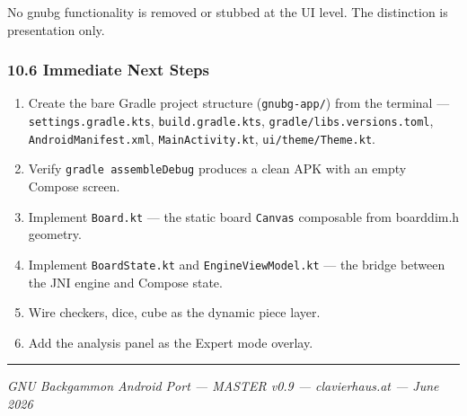 \documentclass[11pt,a4paper]{article}
\providecommand{\tightlist}{\setlength{\itemsep}{2pt}\setlength{\parskip}{0pt}}
\begin{document}
No gnubg functionality is removed or stubbed at the UI level. The
distinction is presentation only.

\subsubsection{10.6 Immediate Next Steps}\label{immediate-next-steps-v09}

\begin{enumerate}
\def\labelenumi{\arabic{enumi}.}
\tightlist
\item
  Create the bare Gradle project structure (\texttt{gnubg-app/}) from
  the terminal --- \texttt{settings.gradle.kts},
  \texttt{build.gradle.kts}, \texttt{gradle/libs.versions.toml},
  \texttt{AndroidManifest.xml}, \texttt{MainActivity.kt},
  \texttt{ui/theme/Theme.kt}.
\item
  Verify \texttt{gradle assembleDebug} produces a clean APK with an
  empty Compose screen.
\item
  Implement \texttt{Board.kt} --- the static board \texttt{Canvas}
  composable from boarddim.h geometry.
\item
  Implement \texttt{BoardState.kt} and \texttt{EngineViewModel.kt} ---
  the bridge between the JNI engine and Compose state.
\item
  Wire checkers, dice, cube as the dynamic piece layer.
\item
  Add the analysis panel as the Expert mode overlay.
\end{enumerate}

\begin{center}\rule{0.5\linewidth}{0.5pt}\end{center}

\emph{GNU Backgammon Android Port --- MASTER v0.9 --- clavierhaus.at ---
June 2026}
\end{document}
